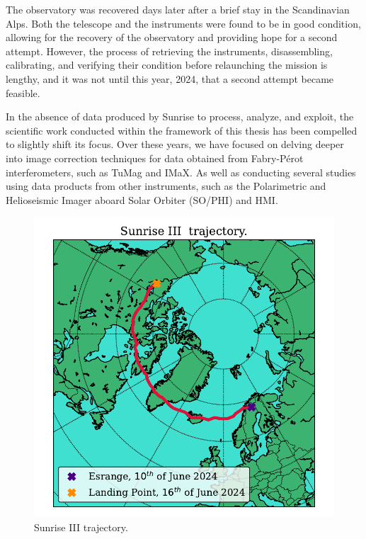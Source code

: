 The observatory was recovered days later after a brief stay in the Scandinavian Alps. Both the telescope and the instruments were found to be in good condition, allowing for the recovery of the observatory and providing hope for a second attempt. However, the process of retrieving the instruments, disassembling, calibrating, and verifying their condition before relaunching the mission is lengthy, and it was not until this year, 2024, that a second attempt became feasible.

In the absence of data produced by Sunrise to process, analyze, and exploit, the scientific work conducted within the framework of this thesis has been compelled to slightly shift its focus. Over these years, we have focused on delving deeper into image correction techniques for data obtained from Fabry-Pérot interferometers, such as TuMag and IMaX. As well as conducting several studies using data products from other instruments, such as the Polarimetric and Helioseismic Imager aboard Solar Orbiter (SO/PHI) and HMI. 

\begin{figure}
  \centering
  \includegraphics[width = \textwidth]{figures/Introduction/SunriseIII_trajectory.pdf}
  \caption{Sunrise III trajectory.} 
  \label{fig_intro: sunrise_trajectory}
\end{figure}



